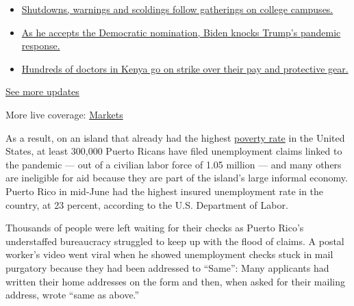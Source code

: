 \begin{itemize}
\tightlist
\item
  \href{https://www.nytimes3xbfgragh.onion/2020/08/21/world/covid-19-coronavirus.html?action=click\&pgtype=Article\&state=default\&region=MAIN_CONTENT_1\&context=storylines_live_updates\#link-4690b6aa}{Shutdowns,
  warnings and scoldings follow gatherings on college campuses.}
\item
  \href{https://www.nytimes3xbfgragh.onion/2020/08/21/world/covid-19-coronavirus.html?action=click\&pgtype=Article\&state=default\&region=MAIN_CONTENT_1\&context=storylines_live_updates\#link-324af071}{As
  he accepts the Democratic nomination, Biden knocks Trump's pandemic
  response.}
\item
  \href{https://www.nytimes3xbfgragh.onion/2020/08/21/world/covid-19-coronavirus.html?action=click\&pgtype=Article\&state=default\&region=MAIN_CONTENT_1\&context=storylines_live_updates\#link-35890b73}{Hundreds
  of doctors in Kenya go on strike over their pay and protective gear.}
\end{itemize}

\href{https://www.nytimes3xbfgragh.onion/2020/08/21/world/covid-19-coronavirus.html?action=click\&pgtype=Article\&state=default\&region=MAIN_CONTENT_1\&context=storylines_live_updates}{See
more updates}

More live coverage:
\href{https://www.nytimes3xbfgragh.onion/live/2020/08/20/business/stock-market-today-coronavirus?action=click\&pgtype=Article\&state=default\&region=MAIN_CONTENT_1\&context=storylines_live_updates}{Markets}

As a result, on an island that already had the highest
\href{https://www.census.gov/quickfacts/fact/table/MS,PR/LFE305218}{poverty
rate} in the United States, at least 300,000 Puerto Ricans have filed
unemployment claims linked to the pandemic --- out of a civilian labor
force of 1.05 million --- and many others are ineligible for aid because
they are part of the island's large informal economy. Puerto Rico in
mid-June had the highest insured unemployment rate in the country, at 23
percent, according to the U.S. Department of Labor.

Thousands of people were left waiting for their checks as Puerto Rico's
understaffed bureaucracy struggled to keep up with the flood of claims.
A postal worker's video went viral when he showed unemployment checks
stuck in mail purgatory because they had been addressed to ``Same'':
Many applicants had written their home addresses on the form and then,
when asked for their mailing address, wrote ``same as above.''

